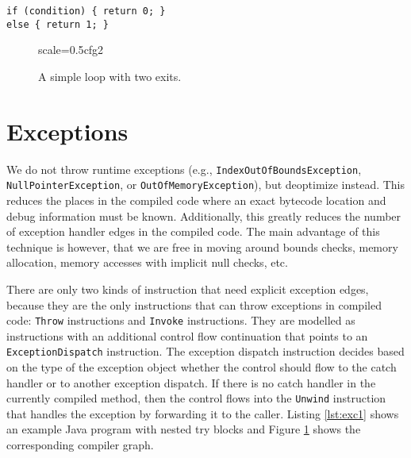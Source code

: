 \documentclass[twocolumn]{svjour3}
\begin{document}
\begin{lstlisting}[label=lst:cfg2, caption=Control flow in the graph, captionpos=b]
if (condition) { return 0; }
else { return 1; }
\end{lstlisting}


\begin{figure}[h]
  \centering
\begin{digraphenv}{scale=0.5}{cfg2}
\end{digraphenv}
  \caption{A simple loop with two exits.}
  \label{fig:exc1}
\end{figure}

\section{Exceptions}
\label{sec:Exceptions}

We do not throw runtime exceptions (e.g., \texttt{IndexOutOf\-BoundsException}, \texttt{NullPointerException}, or \texttt{Out\-Of\-MemoryException}), but deoptimize instead.
This reduces the places in the compiled code where an exact bytecode location and debug information must be known.
Additionally, this greatly reduces the number of exception handler edges in the compiled code.
The main advantage of this technique is however, that we are free in moving around bounds checks, memory allocation, memory accesses with implicit null checks, etc.

There are only two kinds of instruction that need explicit exception edges, because they are the only instructions that can throw exceptions in compiled code: \texttt{Throw} instructions and \texttt{Invoke} instructions.
They are modelled as instructions with an additional control flow continuation that points to an \texttt{ExceptionDispatch} instruction.
The exception dispatch instruction decides based on the type of the exception object whether the control should flow to the catch handler or to another exception dispatch.
If there is no catch handler in the currently compiled method, then the control flows into the \texttt{Unwind} instruction that handles the exception by forwarding it to the caller.
Listing \ref{lst:exc1} shows an example Java program with nested try blocks and Figure \ref{fig:exc1} shows the corresponding compiler graph.
\end{document}

